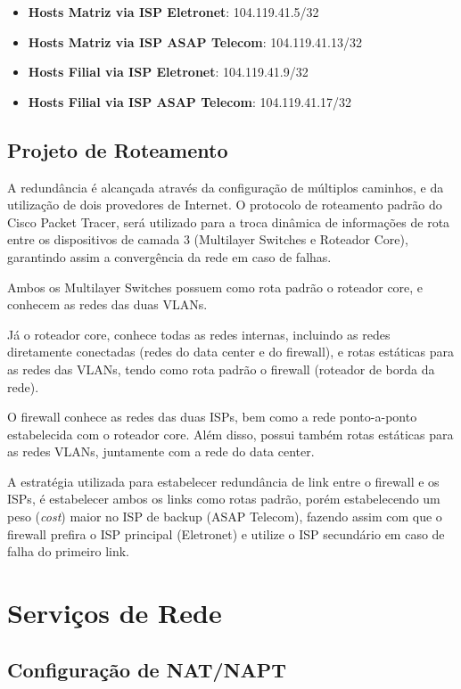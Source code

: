 \documentclass[a4paper, 12pt]{article}
\begin{document}
\begin{itemize}
    \item \textbf{Hosts Matriz via ISP Eletronet}: 104.119.41.5/32
    \item \textbf{Hosts Matriz via ISP ASAP Telecom}: 104.119.41.13/32
    \item \textbf{Hosts Filial via ISP Eletronet}: 104.119.41.9/32
    \item \textbf{Hosts Filial via ISP ASAP Telecom}: 104.119.41.17/32
\end{itemize}


\subsection{Projeto de Roteamento}
\label{subsec:roteamento}

A redundância é alcançada através da configuração de múltiplos caminhos, e da utilização de dois provedores de Internet. O protocolo de roteamento padrão do Cisco Packet Tracer, será utilizado para a troca dinâmica de informações de rota entre os dispositivos de camada 3 (Multilayer Switches e Roteador Core), garantindo assim a convergência da rede em caso de falhas.

Ambos os Multilayer Switches possuem como rota padrão o roteador core, e conhecem as redes das duas VLANs.

Já o roteador core, conhece todas as redes internas, incluindo as redes diretamente conectadas (redes do data center e do firewall), e rotas estáticas para as redes das VLANs, tendo como rota padrão o firewall (roteador de borda da rede).

O firewall conhece as redes das duas ISPs, bem como a rede ponto-a-ponto estabelecida com o roteador core. Além disso, possui também rotas estáticas para as redes VLANs, juntamente com a rede do data center.

A estratégia utilizada para estabelecer redundância de link entre o firewall e os ISPs, é estabelecer ambos os links como rotas padrão, porém estabelecendo um peso (\textit{cost}) maior no ISP de backup (ASAP Telecom), fazendo assim com que o firewall prefira o ISP principal (Eletronet) e utilize o ISP secundário em caso de falha do primeiro link.

\section{Serviços de Rede}
\label{sec:servicos}

\subsection{Configuração de NAT/NAPT}
\label{subsec:nat}
\end{document}
